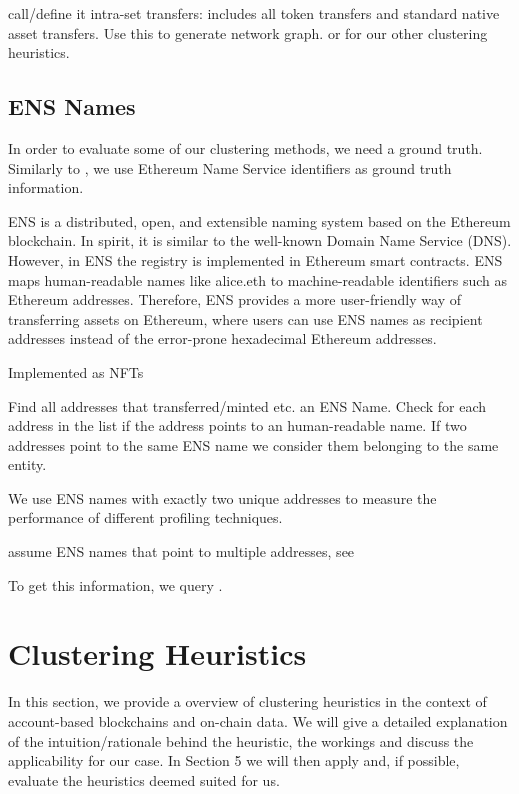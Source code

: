 \documentclass[12pt,a4paper,titlepage,oneside,english]{article}
\begin{document}
call/define it intra-set transfers: includes all token transfers and standard native asset transfers. Use this to generate network graph. or for our other clustering heuristics.

\subsection{ENS Names}
In order to evaluate some of our clustering methods, we need a ground truth. Similarly to \cite{Beres2020}, we use Ethereum Name Service identifiers as ground truth information.

ENS is a distributed, open, and extensible naming system based on the Ethereum blockchain. In spirit, it is similar to the well-known Domain Name Service (DNS). However, in ENS the registry is implemented in Ethereum smart contracts. ENS maps human-readable names like alice.eth to machine-readable identifiers such as Ethereum addresses. Therefore, ENS provides a more user-friendly way of transferring assets on Ethereum, where users can use ENS names as recipient addresses instead of the error-prone hexadecimal Ethereum addresses.

Implemented as NFTs %

Find all addresses that transferred/minted etc. an ENS Name.
Check for each address in the list if the address points to an human-readable name.
If two addresses point to the same ENS name we consider them belonging to the same entity.

We use ENS names with exactly two unique addresses to measure the performance of different profiling techniques.

assume ENS names that point to multiple addresses, see 

To get this information, we query .

 




\section{Clustering Heuristics}
In this section, we provide a overview of clustering heuristics in the context of account-based blockchains and on-chain data. We will give a detailed explanation of the intuition/rationale behind the heuristic, the workings and discuss the applicability for our case. In Section 5 we will then apply and, if possible, evaluate the heuristics deemed suited for us.
\end{document}

